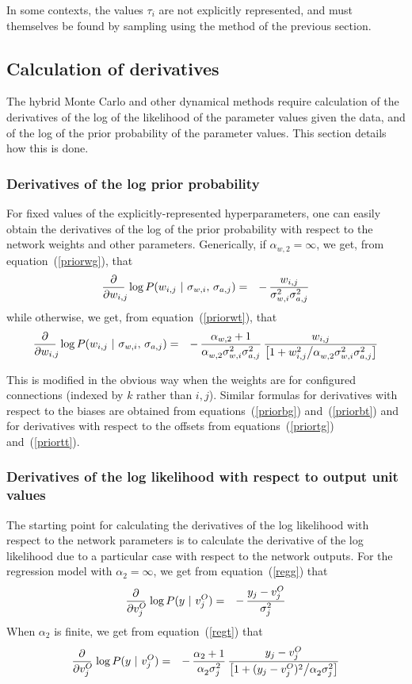 \documentclass{report}[11pt]
\def\beq{\begin{eqnarray}}
\def\eeq{\end{eqnarray}}
\def\eep{\end{eqnarray}}
\begin{document}
In some contexts, the values $\tau_i$ are not explicitly represented,
and must themselves be found by sampling using the method of the
previous section.


\subsection*{Calculation of derivatives}

The hybrid Monte Carlo and other dynamical methods require calculation
of the derivatives of the log of the likelihood of the parameter
values given the data, and of the log of the prior probability of the
parameter values.  This section details how this is done.


\subsubsection*{Derivatives of the log prior probability}

For fixed values of the explicitly-represented hyperparameters, one can
easily obtain the derivatives of the log of the prior probability with 
respect to the network weights and other parameters.  Generically, if
$\alpha_{w,2}=\infty$, we get, from equation~(\ref{priorwg}), that\beq
  {\partial \over \partial w_{i,j}\!\!}\,
     \log P(w_{i,j}\ |\ \sigma_{w,i},\,\sigma_{a,j}) & = &
     -\,{w_{i,j} \over \sigma_{w,i}^2\sigma_{a,j}^2}
\eeq%
while otherwise, we get, from equation~(\ref{priorwt}), that\beq
  {\partial \over \partial w_{i,j}\!\!}\,
     \log P(w_{i,j}\ |\ \sigma_{w,i},\,\sigma_{a,j}) & = &
     -\, {\alpha_{w,2}+1 \over \alpha_{w,2}^{\ }\sigma_{w,i}^2\sigma_{a,j}^2}\,
    { w_{i,j} \over \big[
      1 + w_{i,j}^2 \big/ \alpha_{w,2}^{\ }\sigma_{w,i}^2\sigma_{a,j}^2
      \big]}
\eep

This is modified in the obvious way when the weights are for
configured connections (indexed by $k$ rather than $i,j$).
Similar formulas for derivatives with respect to the biases are
obtained from equations~(\ref{priorbg}) and~(\ref{priorbt}) and for
derivatives with respect to the offsets from equations~(\ref{priortg})
and~(\ref{priortt}).


\subsubsection*{Derivatives of the log likelihood with respect to 
                output unit values}

The starting point for calculating the derivatives of the log
likelihood with respect to the network parameters is to calculate the
derivative of the log likelihood due to a particular case with respect
to the network outputs.  For the regression model with
$\alpha_2=\infty$, we get from equation~(\ref{regg}) that\beq
  {\partial \over \partial v^O_j\!}\, \log P(y\ |\ v^O_j) & = &
    -\, { y_j-v^O_j \over \sigma_j^2 }
\label{regd}\eeq%
When $\alpha_2$ is finite, we get from equation~(\ref{regt})
that\beq
  {\partial \over \partial v^O_j\!}\, \log P(y\ |\ v^O_j) & = &
    -\, { \alpha_2+1 \over \alpha_2^{\ } \sigma_j^2}\,
        { y_j - v^O_j \over \big[1 + (y_j - v^O_j)^2 \big/
                                 \alpha_2^{\ } \sigma_j^2\big] }
\label{regd2}\eep
\end{document}
